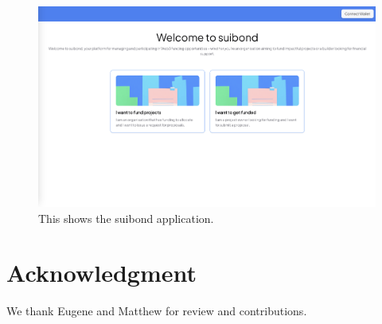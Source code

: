 \documentclass[conference]{IEEEtran}
\begin{document}
\begin{figure}[htbp]
\centerline{\includegraphics[scale=0.1]{suibond.png}}
\caption{This shows the suibond application.}
\label{fig}
\end{figure}


\section*{Acknowledgment}

We thank Eugene and Matthew for review and contributions.



\end{document}
